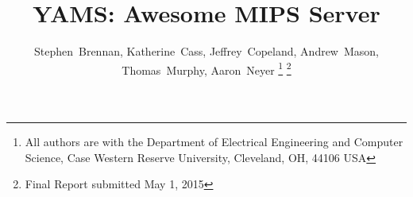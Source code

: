 \documentclass[journal,10pt]{IEEEtran}
\begin{document}
%
\title{YAMS: Awesome MIPS Server}

%
%
%

\author{
Stephen~Brennan,
Katherine~Cass,
Jeffrey~Copeland,
Andrew~Mason,
Thomas~Murphy,
Aaron~Neyer%
\thanks{All authors are with the Department of Electrical Engineering and Computer Science, Case Western Reserve University, Cleveland, OH, 44106 USA}%
\thanks{Final Report submitted May 1, 2015}
} %

%
%



%
{}
\end{document}
